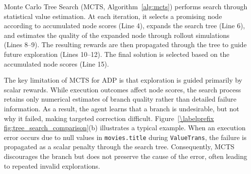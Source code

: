 %
%


Monte Carlo Tree Search (MCTS, Algorithm~\ref{alg:mcts}) performs search through statistical value estimation. At each iteration, it selects a promising node according to accumulated node scores (Line 4), expands the search tree (Line 6), and estimates the quality of the expanded node through rollout simulations (Lines 8--9). The resulting rewards are then propagated through the tree to guide future exploration (Lines 10--12). The final solution is selected based on the accumulated node scores (Line 15).

The key limitation of MCTS for ADP is that exploration is guided primarily by scalar rewards. While execution outcomes affect node scores, the search process retains only numerical estimates of branch quality rather than detailed failure information. As a result, the agent learns that a branch is undesirable, but not why it failed, making targeted correction difficult.
%
Figure~\ref{\labelprefix fig:tree_search_comparison}(b) illustrates a typical example. When an execution error occurs due to null values in \texttt{movies.title} during \texttt{ValueTrans}, the failure is propagated as a scalar penalty through the search tree. Consequently, MCTS discourages the branch but does not preserve the cause of the error, often leading to repeated invalid explorations.

